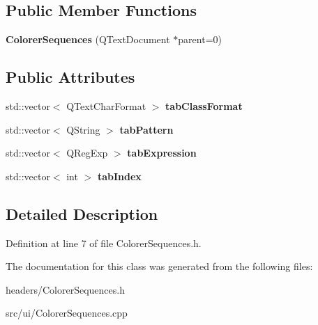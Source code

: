 \subsection*{Public Member Functions}
\begin{DoxyCompactItemize}
\item 
\hypertarget{classColorerSequences_a370adf65a6762bfc723652040cf7f20b}{{\bfseries Colorer\+Sequences} (Q\+Text\+Document $\ast$parent=0)}\label{classColorerSequences_a370adf65a6762bfc723652040cf7f20b}

\end{DoxyCompactItemize}
\subsection*{Public Attributes}
\begin{DoxyCompactItemize}
\item 
\hypertarget{classColorerSequences_a8e7ab751ba21c01472e778c35dc4693a}{std\+::vector$<$ Q\+Text\+Char\+Format $>$ {\bfseries tab\+Class\+Format}}\label{classColorerSequences_a8e7ab751ba21c01472e778c35dc4693a}

\item 
\hypertarget{classColorerSequences_aa034ff8b9f1bf525ed71ba3ebb6c998f}{std\+::vector$<$ Q\+String $>$ {\bfseries tab\+Pattern}}\label{classColorerSequences_aa034ff8b9f1bf525ed71ba3ebb6c998f}

\item 
\hypertarget{classColorerSequences_ad3acffb41c936ed6acb3e8ceba2ecd6e}{std\+::vector$<$ Q\+Reg\+Exp $>$ {\bfseries tab\+Expression}}\label{classColorerSequences_ad3acffb41c936ed6acb3e8ceba2ecd6e}

\item 
\hypertarget{classColorerSequences_aa04308f7ecf022f7c025c7e6f3985b45}{std\+::vector$<$ int $>$ {\bfseries tab\+Index}}\label{classColorerSequences_aa04308f7ecf022f7c025c7e6f3985b45}

\end{DoxyCompactItemize}


\subsection{Detailed Description}


Definition at line 7 of file Colorer\+Sequences.\+h.



The documentation for this class was generated from the following files\+:\begin{DoxyCompactItemize}
\item 
headers/Colorer\+Sequences.\+h\item 
src/ui/Colorer\+Sequences.\+cpp\end{DoxyCompactItemize}
